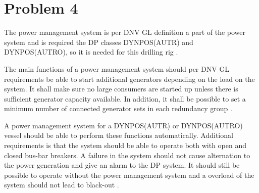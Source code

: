 \section{Problem 4}
The power management system is per DNV GL definition a part of the power system and is required the DP classes DYNPOS(AUTR) and DYNPOS(AUTRO), so it is needed for this drilling rig \cite{RulesShipsDNVGLPart6Chap3}. 

The main functions of a power management system should per DNV GL requirements be able to start additional generators depending on the load on the system. It shall make sure no large consumers are started up unless there is sufficient generator capacity available. In addition, it shall be possible to set a minimum number of connected generator sets in each redundancy group \cite{RulesShipsDNVGLPart6Chap3}. 

A power management system for a DYNPOS(AUTR) or DYNPOS(AUTRO) vessel should be able to perform these functions automatically. Additional requirements is that the system should be able to operate both with open and closed bus-bar breakers. A failure in the system should not cause alternation to the power generation and give an alarm to the DP system. It should still be possible to operate without the power management system and a overload of the system should not lead to black-out \cite{RulesShipsDNVGLPart6Chap3}. 




    



